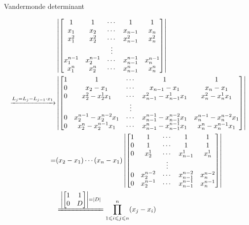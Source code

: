 \documentclass[UTF8]{../09-Mathematics}
\begin{document}
  Vandermonde determinant 

  \begin{equation}
    \begin{aligned}
        &
        \left|
        \begin{bmatrix}
            1 & 1 & \cdots & 1 & 1\\
            x_1 & x_2 & \cdots & x_{n-1} & x_n\\
            x_{1}^2 & x_{2}^2 & \cdots & x_{n-1}^2 & x_{n}^2\\
            &  & \vdots &  & \\
            x_{1}^{n-1} & x_{2}^{n-1} & \cdots & x_{n-1}^{n-1} & x_{n}^{n-1}\\
            x_{1}^{n} & x_{2}^{n} & \cdots & x_{n-1}^{n} & x_{n}^{n}\\
        \end{bmatrix}
        \right|
        \\
        \xrightarrow[]{L_j = L_j - L_{j-1} \cdot x_1}
        &
        \left|
        \begin{bmatrix}
        1 & 1 & \cdots & 1 & 1\\
        0 & x_2-x_1 & \cdots & x_{n-1} -x_1& x_n-x_1\\
        0 & x_{2}^2-x_{2}^1 x_1  & \cdots & x_{n-1}^2-x_{n-1}^1 x_1 & x_{n}^2-x_{n}^1 x_1\\
        &  & \vdots &  & \\
        0 & x_{2}^{n-1}-x_{2}^{n-2}x_1   & \cdots & x_{n-1}^{n-1} -x_{n-1}^{n-2}x_1 & x_{n}^{n-1}-x_{n}^{n-2}x_1 \\
        0 & x_{2}^{n}-x_{2}^{n-1} x_1 & \cdots & x_{n-1}^{n}-x_{n-1}^{n-1} x_1 & x_{n}^{n}-x_{n}^{n-1}x_1 \\
        \end{bmatrix}
        \right|
        \\
        =&
        (x_2-x_1) \cdots (x_n-x_1)
        \left|
        \begin{bmatrix}
           1 & 1 & \cdots & 1 & 1\\
           0 & 1 & \cdots & 1& 1\\
           0 & x_{2}^1  & \cdots & x_{n-1}^1 & x_{n}^1\\
           &  & \vdots &  & \\
           0 & x_{2}^{n-2}   & \cdots & x_{n-1}^{n-2} & x_{n}^{n-2} \\
           0 & x_{2}^{n-1} & \cdots & x_{n-1}^{n-1}  & x_{n}^{n-1} \\
        \end{bmatrix}
        \right|
        \\
        &
        \xlongequal[]{\left|
            \begin{bmatrix}
               1 & 1 \\
               0 & D \\
            \end{bmatrix}
        \right| = |D|}
        \prod_{1\leqslant i \leqslant j \leqslant n}^{n} (x_j-x_i)
    \end{aligned}
\end{equation}
\end{document}
